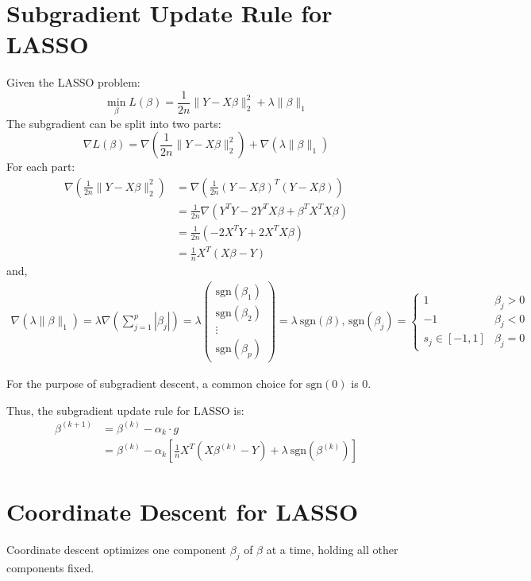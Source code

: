 \documentclass[11pt, a4paper, oneside]{memoir}
\begin{document}
\newpage
\section{Subgradient Update Rule for LASSO}
Given the LASSO problem:
\[ \min_{\beta} L(\beta) = \frac{1}{2n} \|Y - X\beta\|_2^2 + \lambda \|\beta\|_1 \]
The subgradient can be split into two parts:
\[ \nabla L(\beta) = \nabla \left( \frac{1}{2n} \|Y - X\beta\|_2^2 \right) + \nabla \left( \lambda \|\beta\|_1 \right) \]
For each part:
\begin{align*}
  \nabla \left( \frac{1}{2n} \|Y - X\beta\|_2^2 \right) &= \nabla \left( \frac{1}{2n} (Y - X\beta)^T (Y - X\beta) \right) \\
  &= \frac{1}{2n} \nabla \left( Y^T Y - 2Y^T X\beta + \beta^T X^T X \beta \right) \\
  &= \frac{1}{2n} (-2X^T Y + 2X^T X\beta) \\
  &= \frac{1}{n} X^T (X\beta - Y)
\end{align*}
and,
\begin{align*}
  \nabla \left( \lambda \|\beta\|_1 \right) = \lambda \nabla \left( \sum_{j=1}^{p} |\beta_j| \right)
  = \lambda \begin{pmatrix} \text{sgn}(\beta_1) \\ \text{sgn}(\beta_2) \\ \vdots \\ \text{sgn}(\beta_p) \end{pmatrix}
  = \lambda ~\text{sgn}(\beta)
  \text{, } \text{sgn}(\beta_j) = \begin{cases} 1 & \beta_j > 0 \\ -1 & \beta_j < 0 \\ s_j \in [-1, 1] & \beta_j = 0 \end{cases}
\end{align*}

For the purpose of subgradient descent, a common choice for $\text{sgn}(0)$ is $0$.

Thus, the subgradient update rule for LASSO is:
\begin{align*}
  \beta^{(k+1)} &= \beta^{(k)} - \alpha_k \cdot g \\
  &= \beta^{(k)} - \alpha_k \left[ \frac{1}{n} X^T (X\beta^{(k)} - Y) + \lambda ~\text{sgn}(\beta^{(k)}) \right] 
\end{align*}

\section{Coordinate Descent for LASSO}
Coordinate descent optimizes one component $\beta_j$ of $\beta$ at a time, holding all other components fixed.
\end{document}
